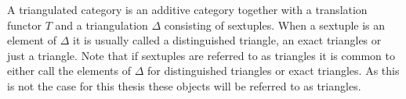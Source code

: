 \documentclass[12pt]{article}
\theoremstyle{definition}
\theoremstyle{remark}
\begin{document}
            \begin{center}
            \end{center}

            A triangulated category is an additive category together with a translation functor $T$ and a triangulation $\Delta$ consisting of sextuples. When a sextuple is an element of $\Delta$ it is usually called a distinguished triangle, an exact triangles or just a triangle. Note that if sextuples are referred to as triangles it is common to either call the elements of $\Delta$ for distinguished triangles or exact triangles. As this is not the case for this thesis these objects will be referred to as triangles.
\end{document}

